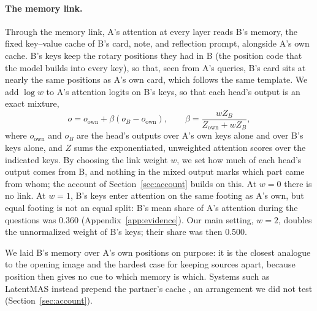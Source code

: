\paragraph{The memory link.}
Through the memory link, A's attention at every layer reads B's memory,
the fixed key--value cache of B's card, note, and reflection prompt,
alongside A's own cache. B's keys keep the rotary positions they had in
B (the position code that the model builds into every key), so that, seen from A's queries, B's card sits at nearly the same
positions as A's own card, which follows the same template. We add
$\log w$ to A's attention logits on B's keys, so that each head's output
is an exact mixture,
\begin{equation}
o=o_{\mathrm{own}}+\beta(o_B-o_{\mathrm{own}}),\qquad
\beta=\frac{w Z_B}{Z_{\mathrm{own}}+w Z_B},
\label{eq:bridge}
\end{equation}
where $o_{\mathrm{own}}$ and $o_B$ are the head's outputs over A's own
keys alone and over B's keys alone, and $Z$ sums the exponentiated,
unweighted attention scores over the indicated keys. By choosing the
link weight $w$, we set how much of each head's output comes from B, and
nothing in the mixed output marks which part came from whom; the
account of Section~\ref{sec:account} builds on this. At $w=0$ there is
no link. At
$w=1$, B's keys enter attention on the same footing as A's own, but
equal footing is not an equal split: B's mean share of A's attention
during the questions was 0.360 (Appendix~\ref{app:evidence}). Our main
setting, $w=2$, doubles the unnormalized weight of B's keys; their share
was then 0.500.

We laid B's memory over A's own positions on purpose: it is the closest
analogue to the opening image and the hardest case for keeping sources
apart, because position then gives no cue to which memory is which. Systems such as
LatentMAS instead prepend the partner's cache \citep{zou2026latentmas},
an arrangement we did not test (Section~\ref{sec:account}).


